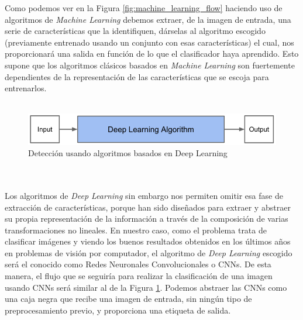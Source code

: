 \documentclass[a4paper,11pt]{book}
\begin{document}
Como podemos ver en la Figura \ref{fig:machine_learning_flow} haciendo uso de algoritmos de \textit{Machine Learning} debemos extraer, de la imagen de entrada, una serie de características que la identifiquen, dárselas al algoritmo escogido (previamente entrenado usando un conjunto con esas características) el cual, nos proporcionará una salida en función de lo que el clasificador haya aprendido. Esto supone que los algoritmos clásicos basados en \textit{Machine Learning} son fuertemente dependientes de la representación de las características que se escoja para entrenarlos\cite{bengio_courville_vincent14}. \\ \\
\begin{figure}[h]
	\centering
	\includegraphics[width=0.7\linewidth]{imagenes/deep_learning_flow}
	\caption[Deep learning]{Detección usando algoritmos basados en Deep Learning \cite{moujahid16}}
	\label{fig:deep_learning_flow}
\end{figure}
\\ \\
Los algoritmos de \textit{Deep Learning} sin embargo nos permiten omitir esa fase de extracción de características, porque han sido diseñados para extraer y abstraer su propia representación de la información a través de la composición de varias transformaciones no lineales\cite{bengio_courville_vincent14}. En nuestro caso, como el problema trata de clasificar imágenes y viendo los buenos resultados obtenidos en los últimos años en problemas de visión por computador\cite{deshpande16}, el algoritmo de \textit{Deep Learning} escogido será el conocido como Redes Neuronales Convolucionales o CNNs. De esta manera, el flujo que se seguiría para realizar la clasificación de una imagen usando CNNs será similar al de la Figura \ref{fig:deep_learning_flow}. Podemos abstraer las CNNs como una caja negra que recibe una imagen de entrada, sin ningún tipo de preprocesamiento previo, y proporciona una etiqueta de salida.\\
\end{document}
